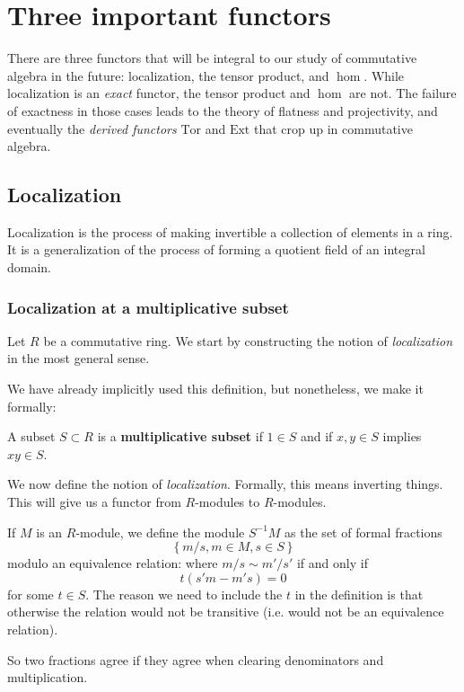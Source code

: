 
\chapter{Three important functors}

There are three functors that will be integral to our study of commutative
algebra in the future: localization, the tensor product, and $\hom$.
While localization is an \emph{exact} functor, the tensor product and $\hom$
are not. The failure of exactness in those cases leads to the theory of
flatness and projectivity, and eventually the \emph{derived functors}
$\mathrm{Tor}$ and $\mathrm{Ext}$ that crop up in commutative algebra.

\section{Localization}

Localization is the process of making invertible a collection of elements in a
ring. It is a generalization of the process of forming a quotient field of an
integral domain.  


\subsection{Localization at a multiplicative subset}

Let $R$ be a commutative ring. 
We start by constructing the notion of \emph{localization} in the most general
sense.

We have already implicitly used this definition, but nonetheless, we make it
formally:
\begin{definition} \label{multset}
A subset $S \subset R$ is a \textbf{multiplicative subset} if $1 \in S$ and
if $x,y \in S$ implies $xy \in S$.
\end{definition} 

We now define the notion of \emph{localization}. Formally, this means inverting things.
This will give us a functor from $R$-modules to $R$-modules. 

\begin{definition} 
If $M$ is an $R$-module, we define the module $S^{-1}M$ as the set of formal
fractions
\[  \left\{m/s, m \in M, s \in S\right\}  \]
modulo an equivalence relation: where $m/s \sim m'/s'$ if and only if 
\[ t( s'm -   m's ) = 0  \]
for some $t \in S$.  The reason we need to include the $t$ in the definition is that otherwise the
 relation would not be transitive (i.e. would not be an
equivalence relation). 
\end{definition} 
So two fractions agree if they agree when clearing denominators and
multiplication.

